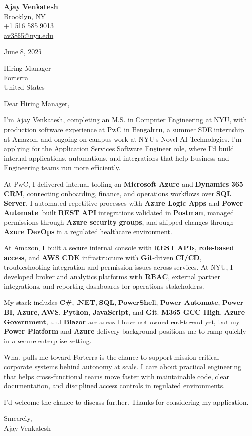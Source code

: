 \documentclass[letterpaper,11pt]{article}
\begin{document}
\begin{flushleft}
\textbf{\large Ajay Venkatesh} \\
Brooklyn, NY \\
+1 516 585 9013 \\
\href{mailto:av3855@nyu.edu}{av3855@nyu.edu}
\end{flushleft}
\vspace{10pt}
June 8, 2026
\vspace{6pt}

Hiring Manager \\
Forterra \\
United States

\vspace{10pt}

Dear Hiring Manager,

I'm Ajay Venkatesh, completing an M.S. in Computer Engineering at NYU, with production software experience at PwC in Bengaluru, a summer SDE internship at Amazon, and ongoing on-campus work at NYU's Novel AI Technologies. I'm applying for the Application Services Software Engineer role, where I'd build internal applications, automations, and integrations that help Business and Engineering teams run more efficiently.

At PwC, I delivered internal tooling on \textbf{Microsoft Azure} and \textbf{Dynamics 365 CRM}, connecting onboarding, finance, and operations workflows over \textbf{SQL Server}. I automated repetitive processes with \textbf{Azure Logic Apps} and \textbf{Power Automate}, built \textbf{REST API} integrations validated in \textbf{Postman}, managed permissions through \textbf{Azure security groups}, and shipped changes through \textbf{Azure DevOps} in a regulated healthcare environment.

At Amazon, I built a secure internal console with \textbf{REST APIs}, \textbf{role-based access}, and \textbf{AWS CDK} infrastructure with \textbf{Git}-driven \textbf{CI/CD}, troubleshooting integration and permission issues across services. At NYU, I developed broker and analytics platforms with \textbf{RBAC}, external partner integrations, and reporting dashboards for operations stakeholders.

My stack includes \textbf{C\#}, \textbf{.NET}, \textbf{SQL}, \textbf{PowerShell}, \textbf{Power Automate}, \textbf{Power BI}, \textbf{Azure}, \textbf{AWS}, \textbf{Python}, \textbf{JavaScript}, and \textbf{Git}. \textbf{M365 GCC High}, \textbf{Azure Government}, and \textbf{Blazor} are areas I have not owned end-to-end yet, but my \textbf{Power Platform} and \textbf{Azure} delivery background positions me to ramp quickly in a secure enterprise setting.

What pulls me toward Forterra is the chance to support mission-critical corporate systems behind autonomy at scale. I care about practical engineering that helps cross-functional teams move faster with maintainable code, clear documentation, and disciplined access controls in regulated environments.

I'd welcome the chance to discuss further. Thanks for considering my application.

\vspace{12pt}
Sincerely, \\
Ajay Venkatesh
\end{document}
